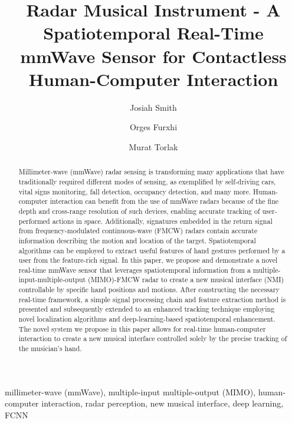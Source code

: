 \documentclass[10pt,journal,final]{IEEEtran}
\begin{document}
\title{Radar Musical Instrument - A Spatiotemporal Real-Time mmWave Sensor for Contactless Human-Computer Interaction}

\author[1]{Josiah Smith}
\author[2]{Orges Furxhi}
\author[1]{Murat Torlak}

\maketitle

\begin{abstract}
	
Millimeter-wave (mmWave) radar sensing is transforming many applications that have traditionally required different modes of sensing, as exemplified by self-driving cars, vital signs monitoring, fall detection, occupancy detection, and many more. Human-computer interaction can benefit from the use of mmWave radars because of the fine depth and cross-range resolution of such devices, enabling accurate tracking of user-performed actions in space. Additionally, signatures embedded in the return signal from frequency-modulated continuous-wave (FMCW) radars contain accurate information describing the motion and location of the target. Spatiotemporal algorithms can be employed to extract useful features of hand gestures performed by a user from the feature-rich signal. In this paper, we propose and demonstrate a novel real-time mmWave sensor that leverages spatiotemporal information from a multiple-input-multiple-output (MIMO)-FMCW radar to create a new musical interface (NMI) controllable by specific hand positions and motions. After constructing the necessary real-time framework, a simple signal processing chain and feature extraction method is presented and subsequently extended to an enhanced tracking technique employing novel localization algorithms and deep-learning-based spatiotemporal enhancement. The novel system we propose in this paper allows for real-time human-computer interaction to create a new musical interface controlled solely by the precise tracking of the musician's hand.
\end {abstract}

\begin{IEEEkeywords}
	millimeter-wave (mmWave), multiple-input multiple-output (MIMO), human-computer interaction, radar perception, new musical interface, deep learning, FCNN
\end{IEEEkeywords}
\end{document}
